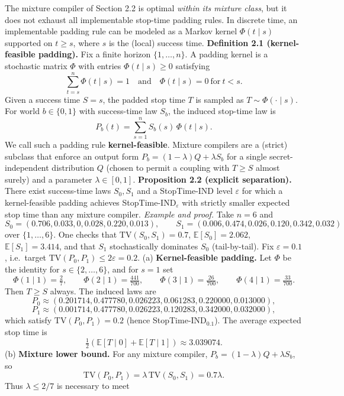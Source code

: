 \documentclass[11pt]{article}
\begin{document}
The mixture compiler of Section 2.2 is optimal \emph{within its mixture
class}, but it does not exhaust all implementable stop-time padding
rules. In discrete time, an implementable padding rule can be modeled as
a Markov kernel \(\Phi(t\mid s)\) supported on \(t\ge s\), where \(s\)
is the (local) success time. \textbf{Definition 2.1 (kernel-feasible
padding).} Fix a finite horizon \(\{1,\dots,n\}\). A padding kernel is a
stochastic matrix \(\Phi\) with entries \(\Phi(t\mid s)\ge 0\)
satisfying \[
\sum_{t=s}^n \Phi(t\mid s)=1\quad\text{and}\quad \Phi(t\mid s)=0\ \text{for}\ t<s.
\] Given a success time \(S=s\), the padded stop time \(T\) is sampled
as \(T\sim\Phi(\cdot\mid s)\). For world \(b\in\{0,1\}\) with
success-time law \(S_b\), the induced stop-time law is \[
P_b(t)=\sum_{s=1}^n S_b(s)\,\Phi(t\mid s).
\] We call such a padding rule \textbf{kernel-feasible}. Mixture
compilers are a (strict) subclass that enforce an output form
\(P_b=(1-\lambda)Q+\lambda S_b\) for a single secret-independent
distribution \(Q\) (chosen to permit a coupling with \(T\ge S\) almost
surely) and a parameter \(\lambda\in[0,1]\). \textbf{Proposition 2.2
(explicit separation).} There exist success-time laws \(S_0,S_1\) and a
StopTime-IND level \(\varepsilon\) for which a kernel-feasible padding
achieves StopTime-IND\(_\varepsilon\) with strictly smaller expected
stop time than any mixture compiler. \emph{Example and proof.} Take
\(n=6\) and \[
S_0=(0.706,0.033,0,0.028,0.220,0.013),\qquad
S_1=(0.006,0.474,0.026,0.120,0.342,0.032)
\] over \(\{1,\dots,6\}\). One checks that \(\mathrm{TV}(S_0,S_1)=0.7\),
\(\mathbb{E}[S_0]=2.062\), \(\mathbb{E}[S_1]=3.414\), and that \(S_1\)
stochastically dominates \(S_0\) (tail-by-tail). Fix
\(\varepsilon=0.1\), i.e.~target
\(\mathrm{TV}(P_0,P_1)\le 2\varepsilon=0.2\). (a)
\textbf{Kernel-feasible padding.} Let \(\Phi\) be the identity for
\(s\in\{2,\dots,6\}\), and for \(s=1\) set \[
\Phi(1\mid 1)=\tfrac{2}{7},\qquad
\Phi(2\mid 1)=\tfrac{441}{700},\qquad
\Phi(3\mid 1)=\tfrac{26}{700},\qquad
\Phi(4\mid 1)=\tfrac{33}{700}.
\] Then \(T\ge S\) always. The induced laws are \[
P_0\approx(0.201714,0.477780,0.026223,0.061283,0.220000,0.013000),
\] \[
P_1\approx(0.001714,0.477780,0.026223,0.120283,0.342000,0.032000),
\] which satisfy \(\mathrm{TV}(P_0,P_1)=0.2\) (hence
StopTime-IND\(_{0.1}\)). The average expected stop time is \[
\tfrac12(\mathbb{E}[T\mid 0]+\mathbb{E}[T\mid 1])\approx 3.039074.
\] (b) \textbf{Mixture lower bound.} For any mixture compiler,
\(P_b=(1-\lambda)Q+\lambda S_b\), so \[
\mathrm{TV}(P_0,P_1)=\lambda\,\mathrm{TV}(S_0,S_1)=0.7\lambda.
\] Thus \(\lambda\le 2/7\) is necessary to meet
\end{document}
